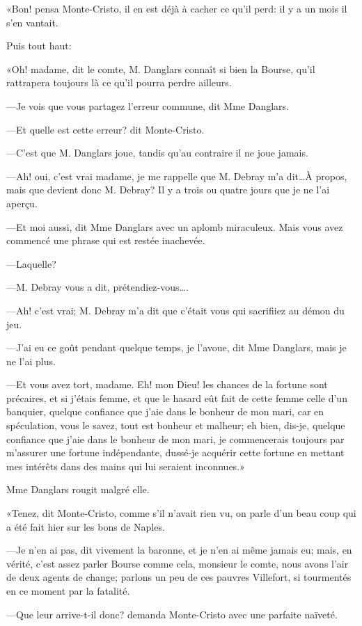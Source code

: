 «Bon! pensa Monte-Cristo, il en est déjà à cacher ce qu'il perd: il y a un mois il s'en vantait. 

Puis tout haut: 

«Oh! madame, dit le comte, M. Danglars connaît si bien la Bourse, qu'il rattrapera toujours là ce qu'il pourra perdre ailleurs. 

—Je vois que vous partagez l'erreur commune, dit Mme Danglars. 

—Et quelle est cette erreur? dit Monte-Cristo. 

—C'est que M. Danglars joue, tandis qu'au contraire il ne joue jamais. 

—Ah! oui, c'est vrai madame, je me rappelle que M. Debray m'a dit\dots À propos, mais que devient donc M. Debray? Il y a trois ou quatre jours que je ne l'ai aperçu. 

—Et moi aussi, dit Mme Danglars avec un aplomb miraculeux. Mais vous avez commencé une phrase qui est restée inachevée. 

—Laquelle? 

—M. Debray vous a dit, prétendiez-vous\dots. 

—Ah! c'est vrai; M. Debray m'a dit que c'était vous qui sacrifiiez au démon du jeu. 

—J'ai eu ce goût pendant quelque temps, je l'avoue, dit Mme Danglars, mais je ne l'ai plus. 

—Et vous avez tort, madame. Eh! mon Dieu! les chances de la fortune sont précaires, et si j'étais femme, et que le hasard eût fait de cette femme celle d'un banquier, quelque confiance que j'aie dans le bonheur de mon mari, car en spéculation, vous le savez, tout est bonheur et malheur; eh bien, dis-je, quelque confiance que j'aie dans le bonheur de mon mari, je commencerais toujours par m'assurer une fortune indépendante, dussé-je acquérir cette fortune en mettant mes intérêts dans des mains qui lui seraient inconnues.» 

Mme Danglars rougit malgré elle. 

«Tenez, dit Monte-Cristo, comme s'il n'avait rien vu, on parle d'un beau coup qui a été fait hier sur les bons de Naples. 

—Je n'en ai pas, dit vivement la baronne, et je n'en ai même jamais eu; mais, en vérité, c'est assez parler Bourse comme cela, monsieur le comte, nous avons l'air de deux agents de change; parlons un peu de ces pauvres Villefort, si tourmentés en ce moment par la fatalité. 

—Que leur arrive-t-il donc? demanda Monte-Cristo avec une parfaite naïveté. 

